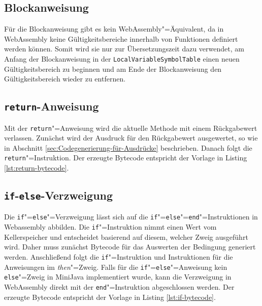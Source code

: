 \subsection{Blockanweisung}
Für die Blockanweisung gibt es kein WebAssembly"=Äquivalent, da in WebAssembly keine Gültigkeitsbereiche innerhalb von Funktionen definiert werden können. Somit wird sie nur zur Übersetzungszeit dazu verwendet, am Anfang der Blockanweisung in der \lstinline{LocalVariableSymbolTable} einen neuen Gültigkeitsbereich zu beginnen und am Ende der Blockanweisung den Gültigkeitsbereich wieder zu entfernen.

\subsection{\lstinline{return}-Anweisung}
Mit der \lstinline{return}"=Anweisung wird die aktuelle Methode mit einem Rückgabewert verlassen. Zunächst wird der Ausdruck für den Rückgabewert ausgewertet, so wie in Abschnitt \ref{sec:Codegenerierung-für-Ausdrücke} beschrieben. Danach folgt die \lstinline{return}"=Instruktion. Der erzeugte Bytecode entspricht der Vorlage in Listing \ref{lst:return-bytecode}.



\subsection{\lstinline{if}-\lstinline{else}-Verzweigung}
Die \lstinline{if}"=\lstinline{else}"=Verzweigung lässt sich auf die \lstinline{if}"=\lstinline{else}"=\lstinline{end}"=Instruktionen in Webassembly abbilden. Die \lstinline{if}"=Instruktion nimmt einen Wert vom Kellerspeicher und entscheidet basierend auf diesem, welcher Zweig ausgeführt wird. Daher muss zunächst Bytecode für das Auswerten der Bedingung generiert werden. Anschließend folgt die \lstinline{if}"=Instruktion und Instruktionen für die Anweisungen im \emph{then}"=Zweig. Falls für die \lstinline{if}"=\lstinline{else}"=Anweisung kein \lstinline{else}"=Zweig in MiniJava implementiert wurde, kann die Verzweigung in WebAssembly direkt mit der \lstinline{end}"=Instruktion abgeschlossen werden. Der erzeugte Bytecode entspricht der Vorlage in Listing \ref{lst:if-bytecode}.



